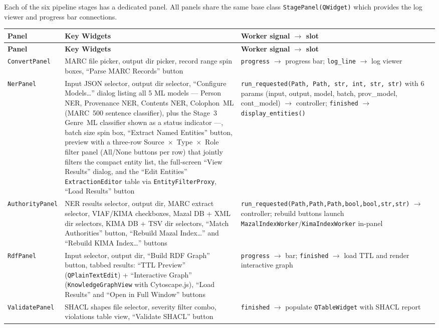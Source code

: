 \documentclass[12pt]{article}
\newcommand{\code}[1]{\texttt{#1}}
\begin{document}
Each of the six pipeline stages has a dedicated panel. All panels share the same base class \code{StagePanel(QWidget)} which provides the log viewer and progress bar connections.

\begin{longtable}{|l|p{4.5cm}|p{4.5cm}|}
\hline
\textbf{Panel} & \textbf{Key Widgets} & \textbf{Worker signal $\to$ slot} \\
\hline
\endfirsthead
\hline
\textbf{Panel} & \textbf{Key Widgets} & \textbf{Worker signal $\to$ slot} \\
\hline
\endhead
\hline
\endfoot
\code{ConvertPanel} & MARC file picker, output dir picker, record range spin boxes, ``Parse MARC Records'' button & \code{progress} $\to$ progress bar; \code{log\_line} $\to$ log viewer \\
\hline
\code{NerPanel} & Input JSON selector, output dir selector, ``Configure Models\ldots'' dialog listing all 5 ML models --- Person NER, Provenance NER, Contents NER, Colophon~ML (MARC~500 sentence classifier), plus the Stage~3 Genre~ML classifier shown as a status indicator ---, batch size spin box, ``Extract Named Entities'' button, preview with a three-row Source~$\times$~Type~$\times$~Role filter panel (All/None buttons per row) that jointly filters the compact entity list, the full-screen ``View Results'' dialog, and the ``Edit Entities'' \code{ExtractionEditor} table via \code{EntityFilterProxy}, ``Load Results'' button & \code{run\_requested(Path, Path, str, int, str, str)} with 6 params (input, output, model, batch, prov\_model, cont\_model) $\to$ controller; \code{finished} $\to$ \code{display\_entities()} \\
\hline
\code{AuthorityPanel} & NER results selector, output dir, MARC extract selector, VIAF/KIMA checkboxes, Mazal DB + XML dir selectors, KIMA DB + TSV dir selectors, ``Match Authorities'' button, ``Rebuild Mazal Index\ldots'' and ``Rebuild KIMA Index\ldots'' buttons & \code{run\_requested(Path,Path,Path,bool,bool,str,str)} $\to$ controller; rebuild buttons launch \code{MazalIndexWorker}/\code{KimaIndexWorker} in-panel \\
\hline
\code{RdfPanel} & Input selector, output dir, ``Build RDF Graph'' button, tabbed results: ``TTL Preview'' (\code{QPlainTextEdit}) + ``Interactive Graph'' (\code{KnowledgeGraphView} with Cytoscape.js), ``Load Results'' and ``Open in Full Window'' buttons & \code{progress} $\to$ bar; \code{finished} $\to$ load TTL and render interactive graph \\
\hline
\code{ValidatePanel} & SHACL shapes file selector, severity filter combo, violations table view, ``Validate SHACL'' button & \code{finished} $\to$ populate \code{QTableWidget} with SHACL report \\

\end{longtable}
\end{document}
